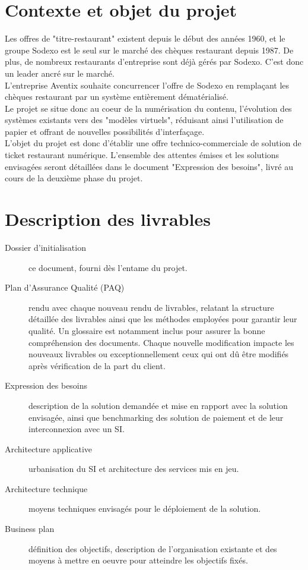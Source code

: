 
\usepackage{lscape}
\usepackage{wrapfig}
\usepackage{float}



\section{Contexte et objet du projet}

Les offres de "titre-restaurant" existent depuis le début des années 1960, et
le groupe Sodexo est le seul sur le marché des chèques restaurant depuis 1987.
De plus, de nombreux restaurants d'entreprise sont déjà gérés par Sodexo. C'est
donc un leader ancré sur le marché. \\

L'entreprise Aventix souhaite concurrencer l'offre de Sodexo en remplaçant les
chèques restaurant par un système entièrement dématérialisé. \\

Le projet se situe donc au coeur de la numérisation du contenu, l'évolution des
systèmes existants vers des "modèles virtuels", réduisant ainsi l'utilisation
de papier et offrant de nouvelles possibilités d'interfaçage. \\

L'objet du projet est donc d'établir une offre technico-commerciale de solution
de ticket restaurant numérique. L'ensemble des attentes émises et les solutions
envisagées seront détaillées dans le document "Expression des besoins", livré
au cours de la deuxième phase du projet.

\section{Description des livrables}
\begin{description}
    \item[Dossier d'initialisation] ce document, fourni dès l'entame du projet.
    \item[Plan d'Assurance Qualité (PAQ)] rendu avec chaque nouveau rendu de
        livrables, relatant la structure détaillée des livrables ainsi que les
        méthodes employées pour garantir leur qualité. Un glossaire est
        notamment inclus pour assurer la bonne compréhension des documents.
        Chaque nouvelle modification impacte les nouveaux livrables ou
        exceptionnellement ceux qui ont dû être modifiés après vérification de
        la part du client.
    \item[Expression des besoins] description de la solution demandée et mise en
        rapport avec la solution envisagée, ainsi que benchmarking des solution
        de paiement et de leur interconnexion avec un SI.
    \item[Architecture applicative] urbanisation du SI et architecture des services mis en jeu.
    \item[Architecture technique] moyens techniques envisagés pour le déploiement de la solution.
    \item[Business plan] définition des objectifs, description de l'organisation
        existante et des moyens à mettre en oeuvre pour atteindre les objectifs
        fixés.
\end{description}

